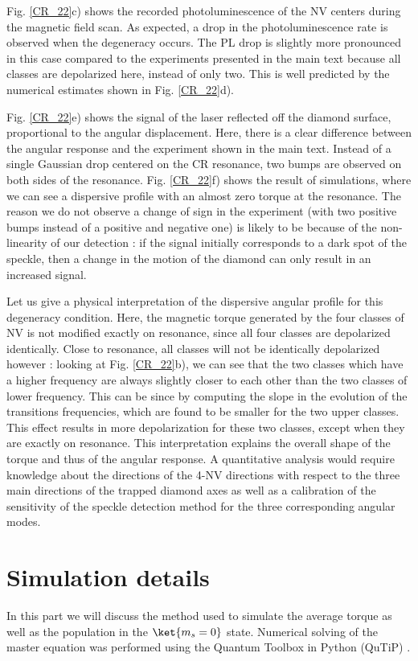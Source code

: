 \documentclass[preprintnumbers,amsmath,amssymb,onecolumn,12pt]{revtex4}
\begin{document}
Fig. \ref{CR_22}c) shows the recorded photoluminescence of the NV centers during the magnetic field scan. As expected, a drop in the photoluminescence rate is observed when the degeneracy occurs. The PL drop is slightly more pronounced in this case compared to the experiments presented in the main text because all classes are depolarized here, instead of only two. This is well predicted by the numerical estimates shown in Fig. \ref{CR_22}d).

Fig. \ref{CR_22}e) shows the signal of the laser reflected off the diamond surface, proportional to the angular displacement. Here, there is a clear difference between the angular response and the experiment shown in the main text. Instead of a single Gaussian drop centered on the CR resonance, two bumps are observed on both sides of the resonance. 
Fig. \ref{CR_22}f) shows the result of simulations, where we can see a dispersive profile with an almost zero torque at the resonance. 
The reason we do not observe a change of sign in the experiment (with two positive bumps instead of a positive and negative one) is likely to be because of the non-linearity of our detection : if the signal initially corresponds to a dark spot of the speckle, then a change in the motion of the diamond can only result in an increased signal. 

Let us give a physical interpretation of the dispersive angular profile for this degeneracy condition. 
Here, the magnetic torque generated by the four classes of NV is not modified exactly on resonance, since all four classes are depolarized identically. Close to resonance, all classes will not be identically depolarized however : looking at Fig. \ref{CR_22}b), we can see that the two classes which have a higher frequency are always slightly closer to each other than the two classes of lower frequency. This can be since by computing the slope in the evolution of the transitions frequencies, which are found to be smaller for the two upper classes. 
This effect results in more depolarization for these two classes, except when they are exactly on resonance. This interpretation explains the overall shape of the torque and thus of the angular response.
A quantitative analysis would require knowledge about the directions of the 4-NV directions with respect to the three main directions of the trapped diamond axes as well as a calibration of the sensitivity of the speckle detection method for the three corresponding angular modes. 

\section{Simulation details}
\label{Simu}
In this part we will discuss the method used to simulate the average torque as well as the population in the $\ket{m_s=0}$ state. Numerical solving of the master equation was performed using the Quantum Toolbox in Python (QuTiP) \citep{qutip1} \citep{qutip2}.
\end{document}
